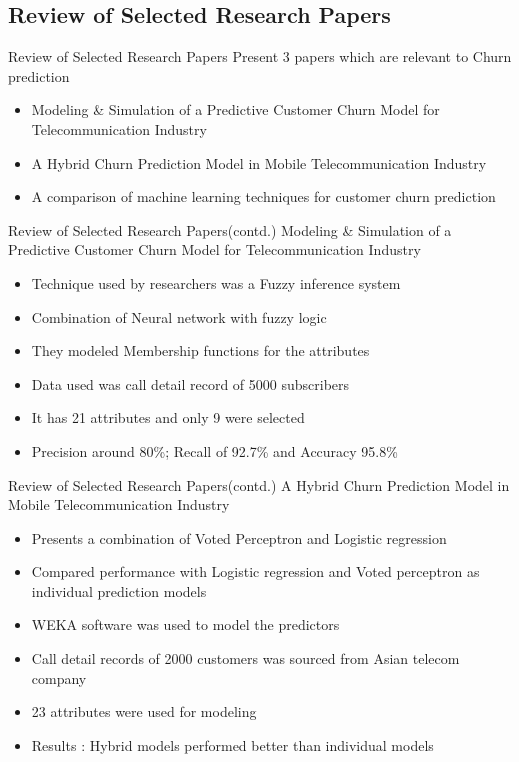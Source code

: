 \documentclass{beamer}
\begin{document}
\subsection{Review of Selected Research Papers}
\begin{frame}{Review of Selected Research Papers}
	Present 3 papers which are relevant to Churn prediction
	\begin{itemize}
		\item Modeling \& Simulation of a Predictive Customer Churn Model for Telecommunication Industry
		\item A Hybrid Churn Prediction Model in Mobile Telecommunication Industry
		\item A comparison of machine learning techniques for customer churn prediction
	\end{itemize}
\end{frame}

\begin{frame}{Review of Selected Research Papers(contd.)}
	Modeling \& Simulation of a Predictive Customer Churn Model for Telecommunication Industry
	\begin{itemize}
		\item Technique used by researchers was a Fuzzy inference system
		\item Combination of Neural network with fuzzy logic
		\item They modeled Membership functions for the attributes
		\item Data used was call detail record of 5000 subscribers 
		\item It has 21 attributes and only 9 were selected
		\item Precision around 80\%; Recall of 92.7\% and Accuracy 95.8\%
	\end{itemize}
\end{frame}

\begin{frame}{Review of Selected Research Papers(contd.)}
	A Hybrid Churn Prediction Model in Mobile Telecommunication Industry
	\begin{itemize}
		\item Presents a combination of Voted Perceptron and Logistic regression
		\item Compared performance with Logistic regression and Voted perceptron as individual prediction models
		\item WEKA software was used to model the predictors
		\item Call detail records of 2000 customers was sourced from Asian telecom company
		\item 23 attributes were used for modeling
		\item Results : Hybrid models performed better than individual models
	\end{itemize}
\end{frame}
\end{document}
